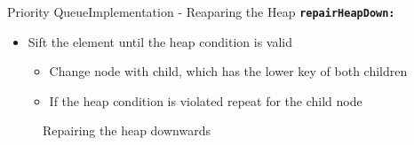 \begin{frame}{Priority Queue}{Implementation - Reaparing the Heap}
  {\color{Mittel-Blau}\texttt{\textbf{repairHeapDown:}}}
  \begin{itemize}
    \item
      {\color{Mittel-Blau}Sift} the element until the
      {\color{Mittel-Blau}heap condition} is valid
      \begin{itemize}
        \item
          Change node with child, which has the lower key of both children
        \item
          If the {\color{Mittel-Blau}heap condition} is violated repeat for
          the child node
      \end{itemize}
  \end{itemize}
  \begin{center}
    \begin{figure}[!h]%
      \begin{columns}%
        \begin{column}{0.45\textwidth}%
          \begin{minipage}{\textwidth}%
            \begin{center}%
            \end{center}%
          \end{minipage}%
        \end{column}%
        \begin{column}{0.45\textwidth}%
          \begin{minipage}{\textwidth}%
            \begin{center}%
            \end{center}%
          \end{minipage}%
        \end{column}%
      \end{columns}%
      \caption{Repairing the heap downwards}%
      \label{fig:priority_queue:impl_repair_heap_down2}%
    \end{figure}
  \end{center}
\end{frame}


